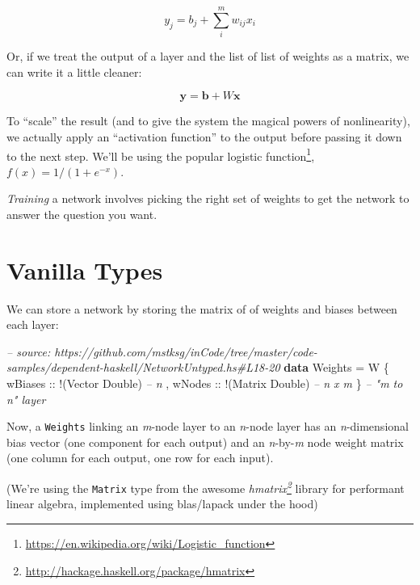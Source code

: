 \documentclass[]{article}
\newenvironment{Shaded}{}{}
\newcommand{\KeywordTok}[1]{\textcolor[rgb]{0.00,0.44,0.13}{\textbf{{#1}}}}
\newcommand{\DataTypeTok}[1]{\textcolor[rgb]{0.56,0.13,0.00}{{#1}}}
\newcommand{\CommentTok}[1]{\textcolor[rgb]{0.38,0.63,0.69}{\textit{{#1}}}}
\newcommand{\OtherTok}[1]{\textcolor[rgb]{0.00,0.44,0.13}{{#1}}}
\newcommand{\FunctionTok}[1]{\textcolor[rgb]{0.02,0.16,0.49}{{#1}}}
\newcommand{\NormalTok}[1]{{#1}}
\renewcommand{\href}[2]{#2\footnote{\url{#1}}}
\begin{document}
\[
y_j = b_j + \sum_i^m w_{ij} x_i
\]

Or, if we treat the output of a layer and the list of list of weights as
a matrix, we can write it a little cleaner:

\[
\mathbf{y} = \mathbf{b} + W \mathbf{x}
\]

To ``scale'' the result (and to give the system the magical powers of
nonlinearity), we actually apply an ``activation function'' to the
output before passing it down to the next step. We'll be using the
popular \href{https://en.wikipedia.org/wiki/Logistic_function}{logistic
function}, \(f(x) = 1 / (1 + e^{-x})\).

\emph{Training} a network involves picking the right set of weights to
get the network to answer the question you want.

\section{Vanilla Types}\label{vanilla-types}

We can store a network by storing the matrix of of weights and biases
between each layer:

\begin{Shaded}
\begin{Highlighting}[]
\CommentTok{-- source: https://github.com/mstksg/inCode/tree/master/code-samples/dependent-haskell/NetworkUntyped.hs#L18-20}
\KeywordTok{data} \DataTypeTok{Weights} \FunctionTok{=} \DataTypeTok{W} \NormalTok{\{}\OtherTok{ wBiases ::} \FunctionTok{!}\NormalTok{(}\DataTypeTok{Vector} \DataTypeTok{Double}\NormalTok{)  }\CommentTok{-- n}
                 \NormalTok{,}\OtherTok{ wNodes  ::} \FunctionTok{!}\NormalTok{(}\DataTypeTok{Matrix} \DataTypeTok{Double}\NormalTok{)  }\CommentTok{-- n x m}
                 \NormalTok{\}                              }\CommentTok{-- "m to n" layer}
\end{Highlighting}
\end{Shaded}

Now, a \texttt{Weights} linking an \emph{m}-node layer to an
\emph{n}-node layer has an \emph{n}-dimensional bias vector (one
component for each output) and an \emph{n}-by-\emph{m} node weight
matrix (one column for each output, one row for each input).

(We're using the \texttt{Matrix} type from the awesome
\emph{\href{http://hackage.haskell.org/package/hmatrix}{hmatrix}}
library for performant linear algebra, implemented using blas/lapack
under the hood)
\end{document}
